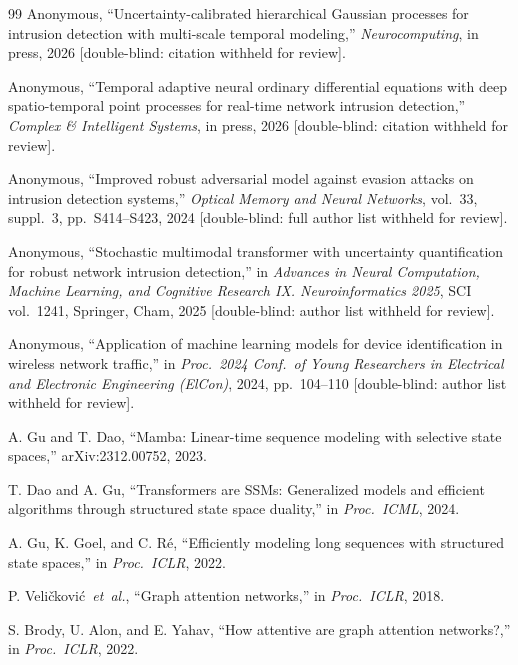 \documentclass[journal,10pt,twocolumn]{IEEEtran}
\begin{document}
\begin{thebibliography}{99}
 Anonymous, ``Uncertainty-calibrated hierarchical Gaussian processes for intrusion detection with multi-scale temporal modeling,'' \textit{Neurocomputing}, in press, 2026 [double-blind: citation withheld for review].

 Anonymous, ``Temporal adaptive neural ordinary differential equations with deep spatio-temporal point processes for real-time network intrusion detection,'' \textit{Complex \& Intelligent Systems}, in press, 2026 [double-blind: citation withheld for review].

 Anonymous, ``Improved robust adversarial model against evasion attacks on intrusion detection systems,'' \textit{Optical Memory and Neural Networks}, vol.~33, suppl.~3, pp.~S414--S423, 2024 [double-blind: full author list withheld for review].

 Anonymous, ``Stochastic multimodal transformer with uncertainty quantification for robust network intrusion detection,'' in \textit{Advances in Neural Computation, Machine Learning, and Cognitive Research IX. Neuroinformatics 2025}, SCI vol.~1241, Springer, Cham, 2025 [double-blind: author list withheld for review].

 Anonymous, ``Application of machine learning models for device identification in wireless network traffic,'' in \textit{Proc.\ 2024 Conf.\ of Young Researchers in Electrical and Electronic Engineering (ElCon)}, 2024, pp.~104--110 [double-blind: author list withheld for review].

 A. Gu and T. Dao, ``Mamba: Linear-time sequence modeling with selective state spaces,'' arXiv:2312.00752, 2023.

 T. Dao and A. Gu, ``Transformers are SSMs: Generalized models and efficient algorithms through structured state space duality,'' in \textit{Proc.\ ICML}, 2024.

 A. Gu, K. Goel, and C. R\'e, ``Efficiently modeling long sequences with structured state spaces,'' in \textit{Proc.\ ICLR}, 2022.

 P. Veli\v{c}kovi\'c~\textit{et~al.}, ``Graph attention networks,'' in \textit{Proc.\ ICLR}, 2018.

 S. Brody, U. Alon, and E. Yahav, ``How attentive are graph attention networks?,'' in \textit{Proc.\ ICLR}, 2022.


\end{thebibliography}
\end{document}
